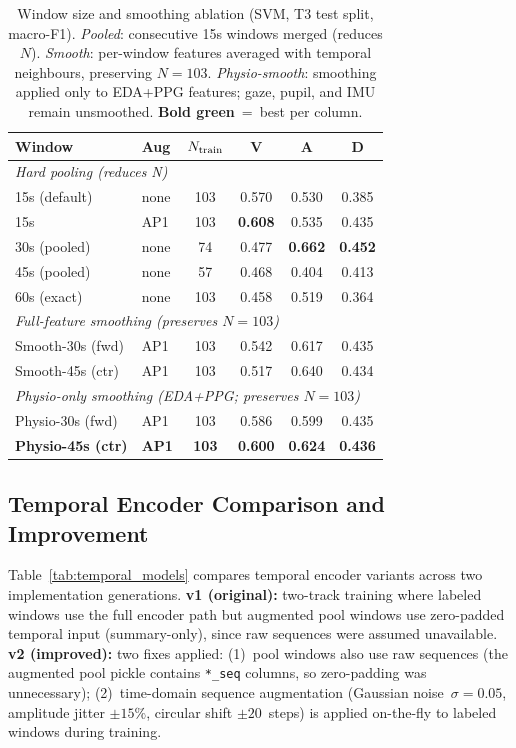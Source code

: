\documentclass[sigconf,nonacm]{acmart}
\newcommand{\best}[1]{\textbf{\textcolor{bestcol}{#1}}}
\begin{document}
\begin{table}[t]
\caption{Window size and smoothing ablation (SVM, T3 test split, macro-F1).
  \emph{Pooled}: consecutive 15s windows merged (reduces $N$).
  \emph{Smooth}: per-window features averaged with temporal neighbours,
  preserving $N{=}103$.
  \emph{Physio-smooth}: smoothing applied only to EDA+PPG features;
  gaze, pupil, and IMU remain unsmoothed.
  \best{Bold green}~=~best per column.}
\label{tab:window}
\centering
\setlength{\tabcolsep}{6pt}
\small
\begin{tabular}{llcccc}
\toprule
\textbf{Window} & \textbf{Aug} & \textbf{$N_{\rm train}$} &
  \textbf{V} & \textbf{A} & \textbf{D} \\
\midrule
\multicolumn{6}{l}{\textit{Hard pooling (reduces N)}} \\
15s (default)       & none & 103 & 0.570 & 0.530 & 0.385 \\
15s                 & AP1  & 103 & \best{0.608} & 0.535 & 0.435 \\
30s (pooled)        & none & 74  & 0.477 & \best{0.662} & \best{0.452} \\
45s (pooled)        & none & 57  & 0.468 & 0.404 & 0.413 \\
60s (exact)         & none & 103 & 0.458 & 0.519 & 0.364 \\
\midrule
\multicolumn{6}{l}{\textit{Full-feature smoothing (preserves $N{=}103$)}} \\
Smooth-30s (fwd)    & AP1  & 103 & 0.542 & 0.617 & 0.435 \\
Smooth-45s (ctr)    & AP1  & 103 & 0.517 & 0.640 & 0.434 \\
\midrule
\multicolumn{6}{l}{\textit{Physio-only smoothing (EDA+PPG; preserves $N{=}103$)}} \\
Physio-30s (fwd)    & AP1  & 103 & 0.586 & 0.599 & 0.435 \\
\textbf{Physio-45s (ctr)} & \textbf{AP1} & \textbf{103} & \best{0.600} & \best{0.624} & \best{0.436} \\
\bottomrule
\end{tabular}
\end{table}

\subsection{Temporal Encoder Comparison and Improvement}
\label{sec:temporal_results}

Table~\ref{tab:temporal_models} compares temporal encoder variants across two
implementation generations.
\textbf{v1 (original):} two-track training where labeled windows use the full
encoder path but augmented pool windows use zero-padded temporal input
(summary-only), since raw sequences were assumed unavailable.
\textbf{v2 (improved):} two fixes applied: (1)~pool windows also use raw
sequences (the augmented pool pickle contains \texttt{*\_seq} columns, so
zero-padding was unnecessary); (2)~time-domain sequence augmentation (Gaussian
noise~$\sigma{=}0.05$, amplitude jitter ${\pm}15\%$, circular shift
${\pm}20$~steps) is applied on-the-fly to labeled windows during training.
\end{document}
